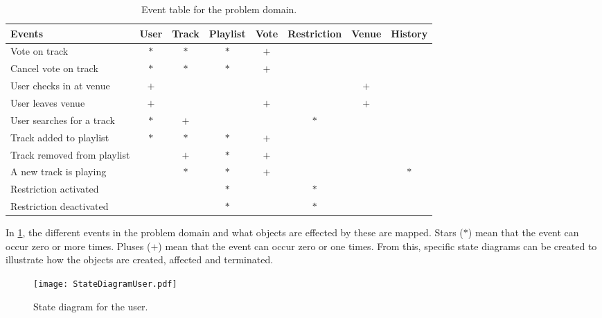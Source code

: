 \begin{table}[htbp]
    \centering
    \tabcolsep=0.10cm
    \begin{tabular}{lccccccc}
        \toprule
        \textbf{Events}                 & User   & Track  & Playlist & Vote   & Restriction & Venue  & History\\
        \midrule
        Vote on track                   & $\ast$ & $\ast$ &   $\ast$ &   $+$  &             &        &        \\
        Cancel vote on track            & $\ast$ & $\ast$ &   $\ast$ &   $+$  &             &        &        \\
        User checks in at venue         & $+$    &        &          &        &             & $+$    &        \\
        User leaves venue               & $+$    &        &          &  $+$   &             & $+$    &        \\
        User searches for a track       & $\ast$ &  $+$   &          &        & $\ast$      &        &        \\
        Track added to playlist         & $\ast$ & $\ast$ & $\ast$   & $+$    &             &        &        \\
        Track removed from playlist     &        & $+$    & $\ast$   & $+$    &             &        &        \\
        A new track is playing          &        & $\ast$ & $\ast$   & $+$    &             &        & $\ast$ \\
        Restriction activated           &        &        & $\ast$   &        & $\ast$      &        &        \\
        Restriction deactivated         &        &        & $\ast$   &        & $\ast$      &        &        \\
        \bottomrule
    \end{tabular}
    \caption{Event table for the problem domain.}\label{eventtable}
\end{table}

In \cref{eventtable}, the different events in the problem domain and
what objects are effected by these are mapped. Stars ($\ast$) mean that the
event can occur zero or more times. Pluses ($+$) mean that the event can
occur zero or one times. From this, specific state diagrams can be created to illustrate how the objects are created, affected and terminated.

\begin{figure}[H]
  \centering
  \texttt{[image: StateDiagramUser.pdf]}
  \caption{State diagram for the user.}\label{fig:StateDiagramUser}
\end{figure}

